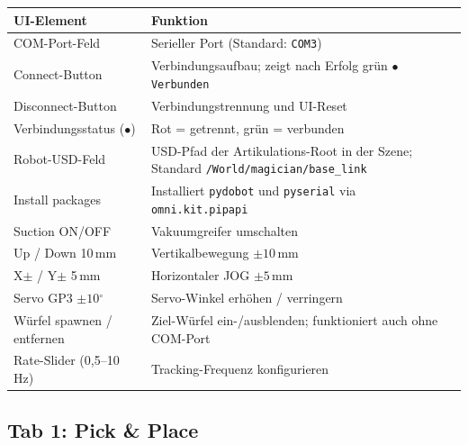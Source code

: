 \documentclass[11pt,a4paper]{article}
\begin{document}
\begin{center}
\begin{tabular}{lp{8cm}}
  \toprule
  UI-Element & Funktion \\
  \midrule
  COM-Port-Feld & Serieller Port (Standard: \texttt{COM3}) \\
  Connect-Button & Verbindungsaufbau; zeigt nach Erfolg grün
                   \texttt{$\bullet$ Verbunden} \\
  Disconnect-Button & Verbindungstrennung und UI-Reset \\
  Verbindungsstatus (\texttt{$\bullet$}) & Rot = getrennt, grün = verbunden \\
  Robot-USD-Feld & USD-Pfad der Artikulations-Root in der Szene;
                   Standard \texttt{/World/magician/base\_link} \\
  Install packages & Installiert \texttt{pydobot} und
                      \texttt{pyserial} via \texttt{omni.kit.pipapi} \\
  Suction ON/OFF & Vakuumgreifer umschalten \\
  Up / Down 10\,mm & Vertikalbewegung $\pm 10$\,mm \\
  X$\pm$ / Y$\pm$ 5\,mm & Horizontaler JOG $\pm 5$\,mm \\
  Servo GP3 $\pm 10{{}^\circ}$ & Servo-Winkel erhöhen / verringern \\
  Würfel spawnen / entfernen & Ziel-Würfel ein-/ausblenden;
                                funktioniert auch ohne COM-Port \\
  Rate-Slider (0,5--10\,Hz) & Tracking-Frequenz konfigurieren \\
  \bottomrule
\end{tabular}
\end{center}

\subsection{Tab 1: Pick \& Place}
\end{document}
